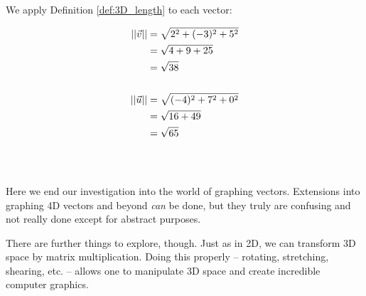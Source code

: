 {We apply Definition \ref{def:3D_length} to each vector:

\begin{align*}
||\vec{v}|| 	&= \sqrt{2^2 + (-3)^2 + 5^2} \\
					&= \sqrt{4 + 9 + 25}\\
					&= \sqrt{38}\\
\\
||\vec{u}|| &= \sqrt{(-4)^2 + 7^2 + 0^2}\\
				&= \sqrt{16+49}\\
				&= \sqrt{65}
\end{align*}
\ } \\ %

Here we end our investigation into the world of graphing vectors. Extensions into graphing 4D vectors and beyond \textit{can} be done, but they truly are confusing and not really done except for abstract purposes. 

There are further things to explore, though. Just as in 2D, we can transform 3D space by matrix multiplication. Doing this properly -- rotating, stretching, shearing, etc. -- allows one to manipulate 3D space and create incredible computer graphics. \\



